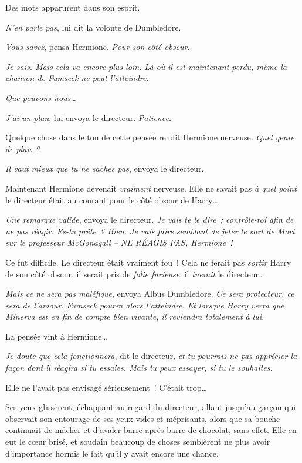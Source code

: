Des mots apparurent dans son esprit.

\emph{N'en parle pas}, lui dit la volonté de Dumbledore.

\emph{Vous savez}, pensa Hermione. \emph{Pour son côté obscur.}

\emph{Je sais. Mais cela va encore plus loin. Là où il est maintenant perdu, même la chanson de Fumseck ne peut l'atteindre.}

\emph{Que pouvons-nous…}

\emph{J'ai un plan}, lui envoya le directeur. \emph{Patience.}

Quelque chose dans le ton de cette pensée rendit Hermione nerveuse. \emph{Quel genre de plan~?}

\emph{Il vaut mieux que tu ne saches pas}, envoya le directeur.

Maintenant Hermione devenait \emph{vraiment} nerveuse. Elle ne savait pas \emph{à quel point} le directeur était au courant pour le côté obscur de Harry…

\emph{Une remarque valide}, envoya le directeur. \emph{Je vais te le dire~; contrôle-toi afin de ne pas réagir. Es-tu prête~? Bien. Je vais faire semblant de jeter le sort de Mort sur le professeur McGonagall -- NE RÉAGIS PAS, Hermione~!}

Ce fut difficile. Le directeur était vraiment fou~! Cela ne ferait pas \emph{sortir} Harry de son côté obscur, il serait pris de \emph{folie furieuse}, il \emph{tuerait} le directeur…

\emph{Mais ce ne sera pas maléfique}, envoya Albus Dumbledore. \emph{Ce sera protecteur, ce sera de l'amour. Fumseck pourra alors l'atteindre. Et lorsque Harry verra que Minerva est en fin de compte bien vivante, il reviendra totalement à lui.}

La pensée vint à Hermione…

\emph{Je doute que cela fonctionnera}, dit le directeur, \emph{et tu pourrais ne pas apprécier la façon dont il réagira si tu essaies. Mais tu peux essayer, si tu le souhaites.}

Elle ne l'avait pas envisagé sérieusement~! C'était trop…

Ses yeux glissèrent, échappant au regard du directeur, allant jusqu'au garçon qui observait son entourage de ses yeux vides et méprisants, alors que sa bouche continuait de mâcher et d'avaler barre après barre de chocolat, sans effet. Elle en eut le cœur brisé, et soudain beaucoup de choses semblèrent ne plus avoir d'importance hormis le fait qu'il y avait encore une chance.

